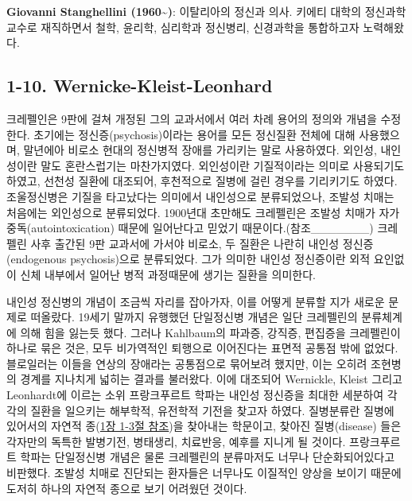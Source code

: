 \documentclass[
]{article}
\begin{document}
\textbf{Giovanni Stanghellini (1960\textasciitilde)}: 이탈리아의 정신과
의사. 키에티 대학의 정신과학 교수로 재직하면서 철학, 윤리학, 심리학과
정신병리, 신경과학을 통합하고자 노력해왔다.

\hypertarget{wernicke-kleist-leonhard}{%
\subsection{1-10.
Wernicke-Kleist-Leonhard}\label{wernicke-kleist-leonhard}}

크레펠인은 9판에 걸쳐 개정된 그의 교과서에서 여러 차례 용어의 정의와
개념을 수정한다. 초기에는 정신증(psychosis)이라는 용어를 모든 정신질환
전체에 대해 사용했으며, 말년에아 비로소 현대의 정신병적 장애를 가리키는
말로 사용하였다. 외인성, 내인성이란 말도 혼란스럽기는 마찬가지였다.
외인성이란 기질적이라는 의미로 사용되기도 하였고, 선천성 질환에
대조되어, 후천적으로 질병에 걸린 경우를 기리키기도 하였다. 조울정신병은
기질을 타고났다는 의미에서 내인성으로 분류되었으나, 조발성 치매는
처음에는 외인성으로 분류되었다. 1900년대 초만해도 크레펠린은 조발성
치매가 자가중독(autointoxication) 때문에 일어난다고 믿었기
때문이다.(참조\_\_\_\_\_\_\_) 크레펠린 사후 출간된 9판 교과서에 가서야
비로소, 두 질환은 나란히 내인성 정신증(endogenous psychosis)으로
분류되었다. 그가 의미한 내인성 정신증이란 외적 요인없이 신체 내부에서
일어난 병적 과정때문에 생기는 질환을 의미한다.

내인성 정신병의 개념이 조금씩 자리를 잡아가자, 이를 어떻게 분류할 지가
새로운 문제로 떠올랐다. 19세기 말까지 유행했던 단일정신병 개념은 일단
크레펠린의 분류체계에 의해 힘을 잃는듯 했다. 그러나 Kahlbaum의 파과증,
강직증, 편집증을 크레펠린이 하나로 묶은 것은, 모두 비가역적인 퇴행으로
이어진다는 표면적 공통점 밖에 없었다. 블로일러는 이들을 연상의 장애라는
공통점으로 묶어보려 했지만, 이는 오히려 조현병의 경계를 지나치게 넓히는
결과를 불러왔다. 이에 대조되어 Wernickle, Kleist 그리고 Leonhardt에
이르는 소위 프랑크푸르트 학파는 내인성 정신증을 최대한 세분하여 각각의
질환을 일으키는 해부학적, 유전학적 기전을 찾고자 하였다. 질병분류란
질병에 있어서의 자연적 종(\protect\hyperlink{modern-period}{1장 1-3절
참조})을 찾아내는 학문이고, 찾아진 질병(disease) 들은 각자만의 독특한
발병기전, 병태생리, 치료반응, 예후를 지니게 될 것이다. 프랑크푸르트
학파는 단일정신병 개념은 물론 크레펠린의 분류마저도 너무나
단순화되어있다고 비판했다. 조발성 치매로 진단되는 환자들은 너무나도
이질적인 양상을 보이기 때문에 도저히 하나의 자연적 종으로 보기 어려웠던
것이다.
\end{document}
